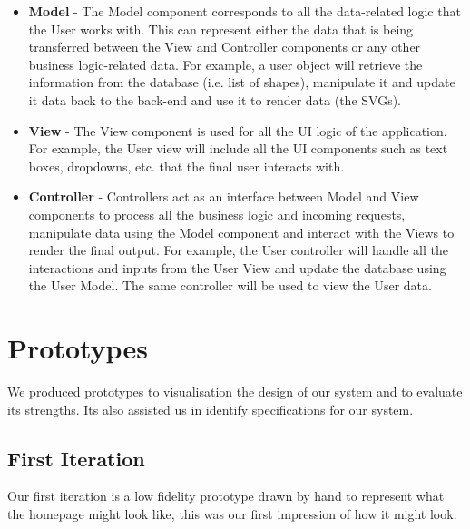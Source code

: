 \documentclass[a4paper]{report}
\begin{document}
	\begin{itemize}
		\item \textbf{Model} - The Model component corresponds to all the data-related logic that the User works with. This can represent either the data that is being transferred between the View and Controller components or any other business logic-related data. For example, a user object will retrieve the information from the database (i.e. list of shapes), manipulate it and update it data back to the back-end and use it to render data (the SVGs). \cite{modelstutorial}
		\item \textbf{View} - The View component is used for all the UI logic of the application. For example, the User view will include all the UI components such as text boxes, dropdowns, etc. that the final user interacts with. \cite{viewstutorial}
		\item \textbf{Controller} - Controllers act as an interface between Model and View components to process all the business logic and incoming requests, manipulate data using the Model component and interact with the Views to render the final output. For example, the User controller will handle all the interactions and inputs from the User View and update the database using the User Model. The same controller will be used to view the User data. \cite{controllertutorial}
	\end{itemize}
	
	
	\section{Prototypes}
	We produced prototypes to visualisation the design of our system and to evaluate its strengths. Its also assisted us in identify specifications for our system.
	
	\subsection{First Iteration}
	
	Our first iteration is a low fidelity prototype drawn by hand to represent what the homepage might look like, this was our first impression of how it might look.
	
\end{document}

